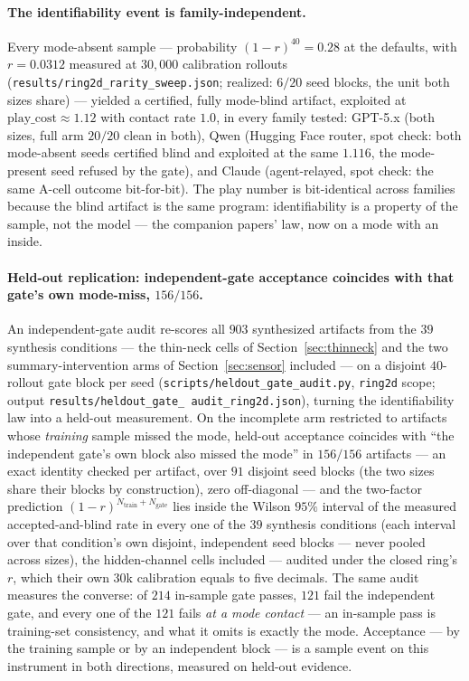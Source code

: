 \documentclass[11pt]{article}
\theoremstyle{remark}
\begin{document}
\paragraph{The identifiability event is family-independent.} Every
mode-absent sample --- probability $(1 - r)^{40} = 0.28$ at the defaults,
with $r = 0.0312$ measured at $30{,}000$ calibration rollouts
(\texttt{results/ring2d\_rarity\_sweep.json}; realized: $6/20$ seed
blocks, the unit both sizes share) --- yielded a certified, fully
mode-blind artifact, exploited at
$\mathrm{play\_cost} \approx 1.12$ with contact rate $1.0$, in every
family tested: GPT-5.x (both sizes, full arm $20/20$ clean in both), Qwen
(Hugging Face router, spot check: both mode-absent seeds certified blind
and exploited at the same $1.116$, the mode-present seed refused by the
gate), and Claude (agent-relayed, spot check: the same A-cell outcome
bit-for-bit). The play
number is bit-identical across families because the blind artifact is the
same program: identifiability is a property of the sample, not the model
--- the companion papers' law, now on a mode with an inside.

\paragraph{Held-out replication: independent-gate acceptance coincides
with that gate's own mode-miss, $156/156$.} An independent-gate audit
re-scores all $903$ synthesized artifacts from the $39$ synthesis
conditions --- the thin-neck cells of
Section~\ref{sec:thinneck} and the two summary-intervention arms of
Section~\ref{sec:sensor} included --- on a disjoint $40$-rollout gate
block per seed
(\texttt{scripts/heldout\_gate\_audit.py}, \texttt{ring2d} scope; output
\texttt{results/heldout\_\allowbreak gate\_\allowbreak
audit\_\allowbreak ring2d.json}), turning the identifiability law into a
held-out
measurement. On the incomplete arm restricted to artifacts whose
\emph{training} sample missed the mode, held-out acceptance coincides
with ``the independent gate's own block also missed the mode'' in
$156/156$ artifacts --- an exact identity checked per artifact, over
$91$ disjoint seed blocks (the two sizes share their blocks by
construction), zero off-diagonal --- and the two-factor prediction
$(1-r)^{N_{\mathrm{train}}+N_{\mathrm{gate}}}$ lies inside
the Wilson $95\%$ interval of the measured accepted-and-blind rate in
every one of the $39$ synthesis conditions (each interval over that
condition's own
disjoint, independent seed blocks --- never pooled across sizes), the
hidden-channel cells included --- audited
under the closed ring's $r$, which their own $30$k calibration equals to
five decimals. The same audit measures the converse: of $214$ in-sample
gate passes, $121$ fail the independent gate, and every one of the $121$
fails \emph{at a mode contact} --- an in-sample pass is training-set
consistency, and what it omits is exactly the mode. Acceptance --- by
the training sample or by an independent block --- is a sample event on
this instrument in both directions, measured on held-out evidence.
\end{document}
